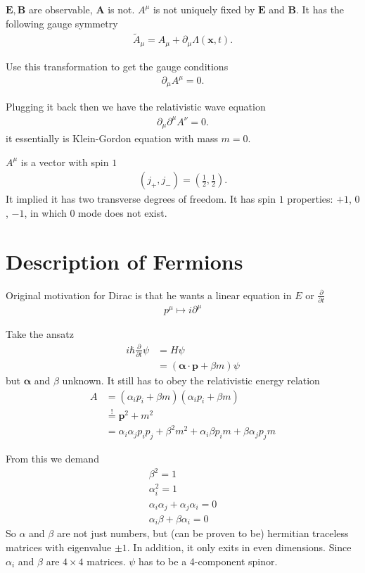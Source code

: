 $\pmb{E}, \pmb{B}$ are observable, $\pmb{A}$ is not. $A^\mu$ is not uniquely fixed by $\pmb{E}$ and $\pmb{B}$. It has the following gauge symmetry
\begin{align}
   \tilde{A}_{\mu} = A_\mu + \partial_\mu \Lambda(\pmb{x}, t).
\end{align}

Use this transformation to get the gauge conditions
\begin{align}
   \partial_\mu A^\mu = 0.
\end{align}

Plugging it back then we have the relativistic wave equation
\begin{align}
   \partial_\mu \partial^\mu A^\nu = 0.
\end{align}
it essentially is Klein-Gordon equation with mass $m=0$.

$A^\mu$ is a vector with spin $1$
\begin{align*}
   (j_+, j_-) = \left( \frac{1}{2}, \frac{1}{2} \right).
\end{align*}
It implied it has two transverse degrees of freedom. It has spin $1$ properties: $+1$, $0$, $-1$, in which $0$ mode does not exist.

\section{Description of Fermions}
Original motivation for Dirac is that he wants a linear equation in $E$ or $\frac{\partial}{\partial t}$
\begin{align*}
   p^\mu \mapsto i\partial^\mu
\end{align*}

Take the ansatz
\begin{align*}
   i\hbar \frac{\partial}{\partial t}\psi &= H \psi \\
   &= (\pmb{\alpha}\cdot \pmb{p} + \beta m ) \psi
\end{align*}
but $\pmb{\alpha}$ and $\beta$ unknown. It still has to obey the relativistic energy relation
\begin{align*}
   A &= \left( \alpha_ip_i + \beta m \right) \left( \alpha_ip_i + \beta m \right) \\
     &\stackrel{!}{=} \pmb{p}^2 + m^2 \\
     &= \alpha_i \alpha_j p_i p_j + \beta^2m^2 + \alpha_i \beta p_i m + \beta \alpha_j p_j m
\end{align*}

From this we demand
\begin{align}
   \beta^2 = 1 \\
   \alpha_i^2 = 1 \\
   \alpha_i \alpha_j + \alpha_j \alpha_i = 0 \\
   \alpha_i \beta + \beta \alpha_i = 0
\end{align}
So $\alpha$ and $\beta$ are not just numbers, but (can be proven to be) hermitian traceless matrices with eigenvalue $\pm 1$.  In addition, it only exits in even dimensions.
Since $\alpha_i$ and $\beta$ are $4\times4$ matrices. $\psi$ has to be a 4-component spinor.

